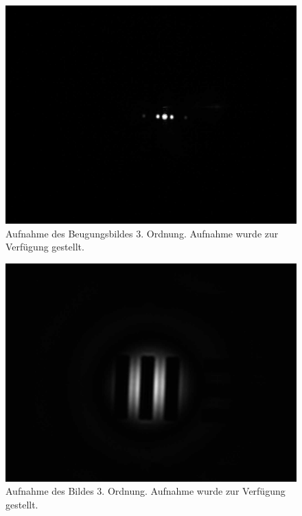 \documentclass{article}
\begin{document}
\begin{minipage}[t]{.45\textwidth}
\begin{figure}[H]
\includegraphics[scale=0.1]{jw/L_BB_3.jpg}
\caption{Aufnahme des Beugungsbildes 3. Ordnung. Aufnahme wurde zur Verfügung gestellt.}
\label{fig:bbild_3_jw}
\end{figure}
\end{minipage}
\hfill
\noindent
\begin{minipage}[t]{.45\textwidth}
\begin{figure}[H]
\includegraphics[scale=0.1]{jw/L_OB_3.jpg}
\caption{Aufnahme des Bildes 3. Ordnung. Aufnahme wurde zur Verfügung gestellt.}\label{fig:bild_3_jw}
\end{figure}
\end{minipage}
\end{document}
